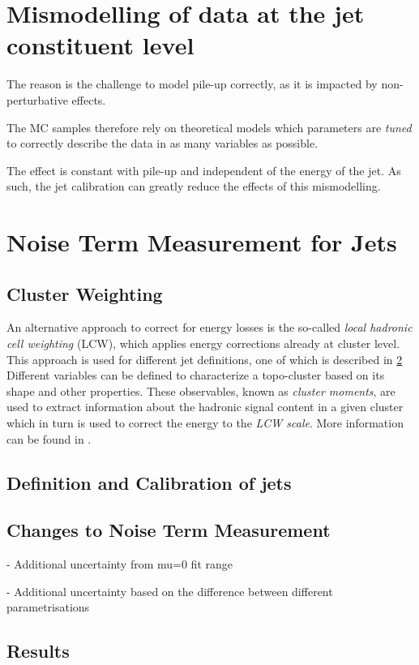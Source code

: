 \chapter{Mismodelling of data at the jet constituent level}
\label{app:constituents-mismodelling}

The reason is the challenge to model pile-up correctly, as it is impacted by non-perturbative effects.

The MC samples therefore rely on theoretical models which parameters are \emph{tuned} to correctly describe the data in as many variables as possible.

The effect is constant with pile-up and independent of the energy of the jet. As such, the jet calibration can greatly reduce the effects of this mismodelling.


\chapter{Noise Term Measurement for \Rscan Jets}
\label{app:noise-term-rscan}


\section{Cluster Weighting}
An alternative approach to correct for energy losses is the so-called \emph{local hadronic cell weighting} (LCW), which applies energy corrections already at cluster level.
This approach is used for different jet definitions, one of which is described in \cref{app:noise-term-rscan}
Different variables can be defined to characterize a topo-cluster based on its shape and other properties. These observables, known as \emph{cluster moments}, are used to extract information about the hadronic signal content in a given cluster which in turn is used to correct the energy to the \emph{LCW scale}. More information can be found in .

\section{Definition and Calibration of \Rscan jets}

\section{Changes to Noise Term Measurement}

- Additional uncertainty from mu=0 fit range

- Additional uncertainty based on the difference between different parametrisations


\section{Results}
